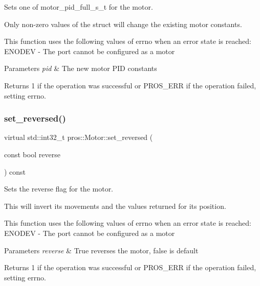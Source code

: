 Sets one of motor\+\_\+pid\+\_\+full\+\_\+s\+\_\+t for the motor. 

Only non-\/zero values of the struct will change the existing motor constants.

This function uses the following values of errno when an error state is reached\+: E\+N\+O\+D\+EV -\/ The port cannot be configured as a motor


\begin{DoxyParams}{Parameters}
{\em pid} & The new motor P\+ID constants\\
\hline
\end{DoxyParams}
\begin{DoxyReturn}{Returns}
1 if the operation was successful or P\+R\+O\+S\+\_\+\+E\+RR if the operation failed, setting errno. 
\end{DoxyReturn}
\mbox{\label{classpros_1_1Motor_a44fcc6447ed1416e880232baa16a221e}} 
\subsubsection{\texorpdfstring{set\+\_\+reversed()}{set\_reversed()}}
{\footnotesize\ttfamily virtual std\+::int32\+\_\+t pros\+::\+Motor\+::set\+\_\+reversed (\begin{DoxyParamCaption}\item[{const bool}]{reverse }\end{DoxyParamCaption}) const\hspace{0.3cm}{\ttfamily [virtual]}}



Sets the reverse flag for the motor. 

This will invert its movements and the values returned for its position.

This function uses the following values of errno when an error state is reached\+: E\+N\+O\+D\+EV -\/ The port cannot be configured as a motor


\begin{DoxyParams}{Parameters}
{\em reverse} & True reverses the motor, false is default\\
\hline
\end{DoxyParams}
\begin{DoxyReturn}{Returns}
1 if the operation was successful or P\+R\+O\+S\+\_\+\+E\+RR if the operation failed, setting errno. 
\end{DoxyReturn}
\mbox{\label{classpros_1_1Motor_a69169ae0cd2b7f68ee533648c7830397}} 
